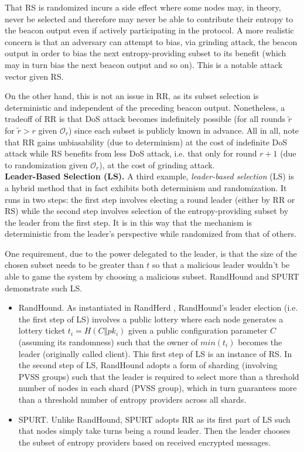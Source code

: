 \documentclass[letterpaper,twocolumn,10pt]{article}
\theoremstyle{definition}
\theoremstyle{remark}
\begin{document}
That RS is randomized incurs a side effect where some nodes may, in theory, never be selected and therefore may never be able to contribute their entropy to the beacon output even if actively participating in the protocol. A more realistic concern is that an adversary can attempt to bias, via grinding attack, the beacon output in order to bias the next entropy-providing subset to its benefit (which may in turn bias the next beacon output and so on). This is a notable attack vector given RS.

On the other hand, this is not an issue in RR, as its subset selection is deterministic and independent of the preceding beacon output. Nonetheless, a tradeoff of RR is that DoS attack becomes indefinitely possible (for all rounds $\tilde{r}$ for $\tilde{r} > r$ given $\mathcal{O}_r$) since each subset is publicly known in advance. All in all, note that RR gains unbiasability (due to determinism) at the cost of indefinite DoS attack while RS benefits from less DoS attack, i.e. that only for round $r + 1$ (due to randomization given $\mathcal{O}_r$), at the cost of grinding attack.\\

\noindent\textbf{Leader-Based Selection (LS).} A third example, \textit{leader-based selection} (LS) is a hybrid method that in fact exhibits both determinism and randomization. It runs in two steps: the first step involves electing a round leader (either by RR or RS) while the second step involves selection of the entropy-providing subset by the leader from the first step. It is in this way that the mechanism is deterministic from the leader's perspective while randomized from that of others.

One requirement, due to the power delegated to the leader, is that the size of the chosen subset needs to be greater than $t$ so that a malicious leader wouldn't be able to game the system by choosing a malicious subset. RandHound \cite{syta2017scalable} and SPURT \cite{das2021spurt} demonstrate such LS.
\begin{itemize}
\item RandHound. As instantiated in RandHerd \cite{syta2017scalable}, RandHound's leader election (i.e. the first step of LS) involves a public lottery where each node generates a lottery ticket $t_i = H(C \mathbin\Vert pk_i)$ given a public configuration parameter $C$ (assuming its randomness) such that the owner of $min(t_i)$ becomes the leader (originally called client). This first step of LS is an instance of RS. In the second step of LS, RandHound adopts a form of sharding (involving PVSS groups) such that the leader is required to select more than a threshold number of nodes in each shard (PVSS group), which in turn guarantees more than a threshold number of entropy providers across all shards.
\item SPURT. Unlike RandHound, SPURT adopts RR as its first part of LS such that nodes simply take turns being a round leader. Then the leader chooses the subset of entropy providers based on received encrypted messages.
\end{itemize}
\end{document}
